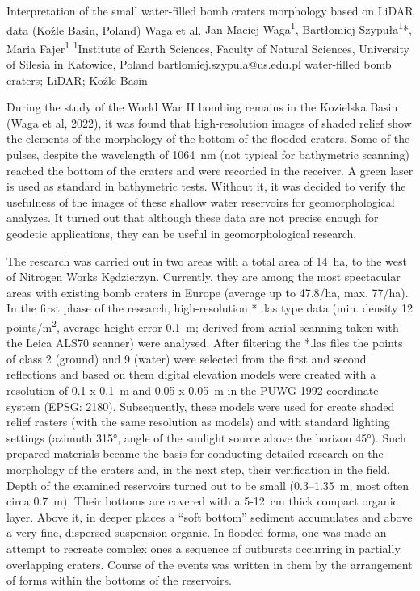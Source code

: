 \abstract
{Interpretation of the small water-filled bomb craters morphology based on LiDAR data (Koźle Basin, Poland)} 
{Waga et al.} 
{Jan Maciej Waga\textsuperscript{1}, Bartłomiej Szypuła\textsuperscript{1}*, Maria Fajer\textsuperscript{1}} 
{\POtag} 
{
		\textsuperscript{1}Institute of Earth Sciences, Faculty of Natural Sciences, University of Silesia in Katowice, Poland
}
{bartlomiej.szypula@us.edu.pl}  %
{water-filled bomb craters; LiDAR; Koźle Basin}
{
During the study of the World War II bombing remains in the Kozielska Basin (Waga et al, 2022), it was found that high-resolution images of shaded relief show the elements of the morphology of the bottom of the flooded craters. Some of the pulses, despite the wavelength of 1064~nm (not typical for bathymetric scanning) reached the bottom of the craters and were recorded in the receiver. A green laser is used as standard in bathymetric tests. Without it, it was decided to verify the usefulness of the images of these shallow water reservoirs for geomorphological analyzes. It turned out that although these data are not precise enough for geodetic applications, they can be useful in geomorphological research.

The research was carried out in two areas with a total area of 14~ha, to the west of Nitrogen Works Kędzierzyn. Currently, they are among the most spectacular areas with existing bomb craters in Europe (average up to 47.8/ha, max. 77/ha). In the first phase of the research, high-resolution * .las type data (min. density 12 points/m\textsuperscript{2}, average height error 0.1~m; derived from aerial scanning taken with the Leica ALS70 scanner) were analysed. After filtering the *.las files the points of class 2 (ground) and 9 (water) were selected from the first and second reflections and based on them digital elevation models were created with a resolution of 0.1 x 0.1~m and 0.05 x 0.05~m in the PUWG-1992 coordinate system (EPSG: 2180). Subsequently, these models were used for create shaded relief rasters (with the same resolution as models) and with standard lighting settings (azimuth 315°, angle of the sunlight source above the horizon 45°). Such prepared materials became the basis for conducting detailed research on the morphology of the craters and, in the next step, their verification in the field. Depth of the examined reservoirs turned out to be small (0.3--1.35~m, most often circa 0.7~m). Their bottoms are covered with a 5-12~cm thick compact organic layer. Above it, in deeper places a \enquote{soft bottom} sediment accumulates and above a very fine, dispersed suspension organic. In flooded forms, one was made an attempt to recreate complex ones a sequence of outbursts occurring in partially overlapping craters. Course of the events was written in them by the arrangement of forms within the bottoms of the reservoirs. 

}
